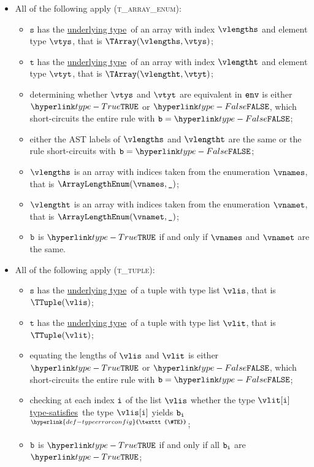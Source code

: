 \documentclass{book}
\newcommand\TypeErrorConfig[0]{\hyperlink{def-typeerrorconfig}{\texttt{\#TE}}}
\newcommand\ProseOrTypeError[0]{\hyperlink{def-proseortypeerror}{$^{\TypeErrorConfig}$}}
\newcommand\underlyingtype[0]{\hyperlink{def-underlyingtype}{underlying type}}
\newcommand\typesatisfies[0]{\hyperlink{def-typesatisfies}{type-satisfies}}
\newcommand\vt[0]{\texttt{t}}
\newcommand\vs[0]{\texttt{s}}
\begin{document}
\begin{itemize}
  \item All of the following apply (\textsc{t\_array\_enum}):
  \begin{itemize}
  \item $\vs$ has the \underlyingtype\ of an array with index $\vlengths$ and element type $\vtys$, that is $\TArray(\vlengths, \vtys)$;
  \item $\vt$ has the \underlyingtype\ of an array with index $\vlengtht$ and element type $\vtyt$, that is $\TArray(\vlengtht, \vtyt)$;
  \item determining whether $\vtys$ and $\vtyt$ are equivalent in $\texttt{env}$ is either $\True$
  or $\False$, which short-circuits the entire rule with $\vb=\False$;
  \item either the AST labels of $\vlengths$ and $\vlengtht$ are the same or the rule short-circuits with $\vb=\False$;
  \item $\vlengths$ is an array with indices taken from the enumeration $\vnames$, that is $\ArrayLengthEnum(\vnames, \Ignore)$;
  \item $\vlengtht$ is an array with indices taken from the enumeration $\vnamet$, that is $\ArrayLengthEnum(\vnamet, \Ignore)$;
  \item $\texttt{b}$ is $\True$ if and only if $\vnames$ and $\vnamet$ are the same.
  \end{itemize}

\item All of the following apply (\textsc{t\_tuple}):
  \begin{itemize}
  \item $\vs$ has the \underlyingtype\ of a tuple with type list $\vlis$, that is $\TTuple(\vlis)$;
  \item $\vt$ has the \underlyingtype\ of a tuple with type list $\vlit$, that is $\TTuple(\vlit)$;
  \item equating the lengths of $\vlis$ and $\vlit$ is either $\True$ or $\False$, which short-circuits
  the entire rule with $\vb=\False$;
  \item checking at each index $\texttt{i}$ of the list $\vlis$ whether the type $\vlit[\vi]$ \typesatisfies\ the type $\vlis[\vi]$
  yields $\texttt{b}_{\texttt{i}}$ \ProseOrTypeError;
  \item $\texttt{b}$ is $\True$ if and only if all $\texttt{b}_{\texttt{i}}$ are $\True$;
  \end{itemize}


\end{itemize}
\end{document}
